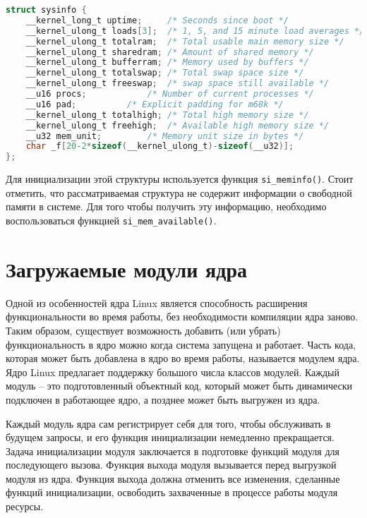 \begin{lstlisting}[label=lst:sysinfo, caption=Листинг структуры \texttt{struct sysinfo}, language=c]
struct sysinfo {
	__kernel_long_t uptime;		/* Seconds since boot */
	__kernel_ulong_t loads[3];	/* 1, 5, and 15 minute load averages */
	__kernel_ulong_t totalram;	/* Total usable main memory size */
	__kernel_ulong_t sharedram;	/* Amount of shared memory */
	__kernel_ulong_t bufferram;	/* Memory used by buffers */
	__kernel_ulong_t totalswap;	/* Total swap space size */
	__kernel_ulong_t freeswap;	/* swap space still available */
	__u16 procs;		   	/* Number of current processes */
	__u16 pad;		   	/* Explicit padding for m68k */
	__kernel_ulong_t totalhigh;	/* Total high memory size */
	__kernel_ulong_t freehigh;	/* Available high memory size */
	__u32 mem_unit;			/* Memory unit size in bytes */
	char _f[20-2*sizeof(__kernel_ulong_t)-sizeof(__u32)];
};
\end{lstlisting}

Для инициализации этой структуры используется функция \texttt{si\_meminfo()}. Стоит отметить, что рассматриваемая структура не содержит информации о свободной памяти в системе. Для того чтобы получить эту информацию, необходимо воспользоваться функцией \texttt{si\_mem\_available()}.

\section{Загружаемые модули ядра}

Одной из особенностей ядра Linux является способность расширения функциональности во время работы, без необходимости компиляции ядра заново. Таким образом, существует возможность добавить (или убрать) функциональность в ядро можно когда система запущена и работает. Часть кода, которая может быть добавлена в ядро во время работы, называется модулем ядра. Ядро Linux предлагает поддержку большого числа классов модулей. Каждый модуль -- это подготовленный объектный код, который может быть динамически подключен в работающее ядро, а позднее может быть выгружен из ядра.

Каждый модуль ядра сам регистрирует себя для того, чтобы обслуживать в будущем запросы, и его функция инициализации немедленно прекращается. Задача инициализации модуля заключается в подготовке функций модуля для последующего вызова. Функция выхода модуля вызывается перед выгрузкой модуля из ядра. Функция выхода должна отменить все изменения, сделанные функций инициализации, освободить захваченные в процессе работы модуля ресурсы. 

